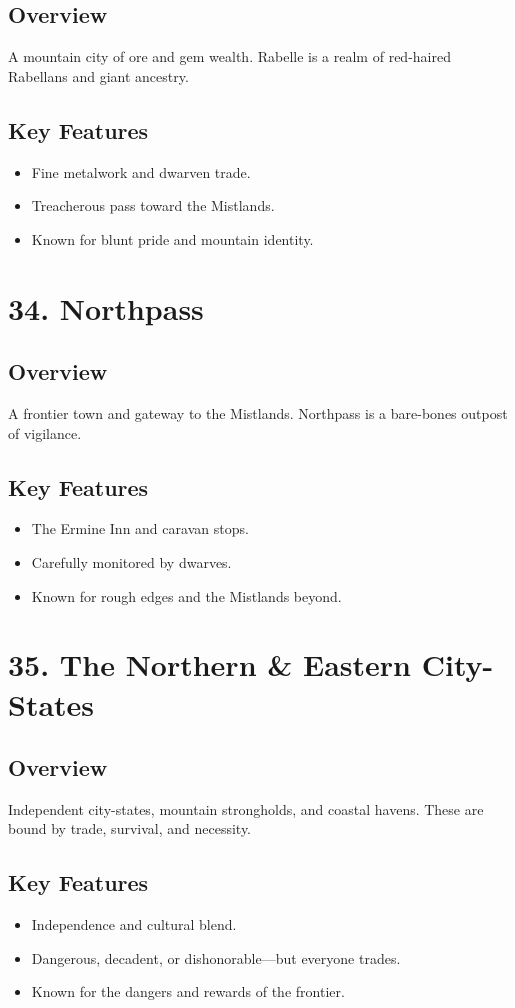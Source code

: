 \documentclass[11pt]{article}
\begin{document}
\subsection*{Overview}
A mountain city of ore and gem wealth. Rabelle is a realm of red-haired Rabellans and giant ancestry.

\subsection*{Key Features}
\begin{itemize}[leftmargin=*]
    \item Fine metalwork and dwarven trade.
    \item Treacherous pass toward the Mistlands.
    \item Known for blunt pride and mountain identity.
\end{itemize}

\section*{34. Northpass}

\subsection*{Overview}
A frontier town and gateway to the Mistlands. Northpass is a bare-bones outpost of vigilance.

\subsection*{Key Features}
\begin{itemize}[leftmargin=*]
    \item The Ermine Inn and caravan stops.
    \item Carefully monitored by dwarves.
    \item Known for rough edges and the Mistlands beyond.
\end{itemize}

\section*{35. The Northern \& Eastern City-States}

\subsection*{Overview}
Independent city-states, mountain strongholds, and coastal havens. These are bound by trade, survival, and necessity.

\subsection*{Key Features}
\begin{itemize}[leftmargin=*]
    \item Independence and cultural blend.
    \item Dangerous, decadent, or dishonorable—but everyone trades.
    \item Known for the dangers and rewards of the frontier.
\end{itemize}
\end{document}
